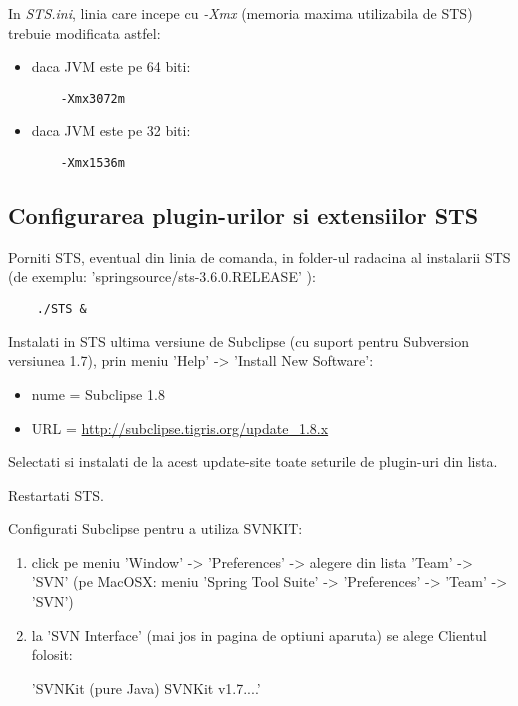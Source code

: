 In \emph{STS.ini}, linia care incepe cu \emph{-Xmx} 
(memoria maxima utilizabila de STS) 
trebuie modificata astfel:
\begin{itemize} 
\item daca JVM este pe 64 biti:
\begin{lstlisting}
	-Xmx3072m
\end{lstlisting}
\item daca JVM este pe 32 biti:
\begin{lstlisting}
	-Xmx1536m
\end{lstlisting}
\end{itemize}

\subsection{Configurarea plugin-urilor si extensiilor STS}

Porniti STS, eventual din linia de comanda, in folder-ul radacina al instalarii STS
(de exemplu: 'springsource/sts-3.6.0.RELEASE' ):
\begin{lstlisting}	
	./STS &
\end{lstlisting}

Instalati in STS ultima versiune de Subclipse 
(cu suport pentru Subversion versiunea 1.7),
prin meniu 'Help' -> 'Install New Software':
\begin{itemize}
\item 
nume = Subclipse 1.8
\item
URL = \url{http://subclipse.tigris.org/update_1.8.x}
\end{itemize}

Selectati si instalati de la acest update-site toate seturile de plugin-uri din lista.

Restartati STS.

Configurati Subclipse pentru a utiliza SVNKIT:
\begin{enumerate}
\item 
click pe meniu 'Window' -> 'Preferences' -> alegere din lista 'Team' -> 'SVN'
(pe MacOSX: meniu 'Spring Tool Suite' -> 'Preferences' -> 'Team' -> 'SVN')
\item
la 'SVN Interface' (mai jos in pagina de optiuni aparuta) se alege Clientul
folosit:

'SVNKit (pure Java) SVNKit v1.7....'
\end{enumerate}

